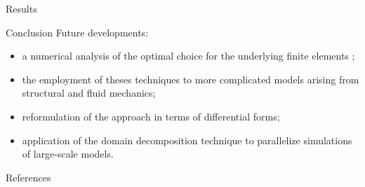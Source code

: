 \documentclass[aspectratio=169]{ISAE-Beamer}
\begin{document}
\begin{frame}[fragile]{Results}

\end{frame}

\begin{frame}{Conclusion}
Future developments:
\begin{itemize}
\item a numerical analysis of the optimal choice for the underlying finite elements ;
\item  the employment of theses techniques to more complicated models arising from structural and fluid mechanics;
\item reformulation of the approach in terms of differential forms;
\item application of the domain decomposition technique to parallelize simulations of large-scale models.
\end{itemize}
\vspace{1cm}
\end{frame}

\begin{frame}[allowframebreaks]{References}
\nocite{*}
\printbibliography
\end{frame}
\end{document}
